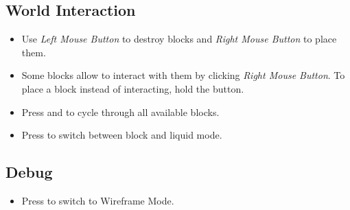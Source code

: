\documentclass{article}
\begin{document}
    \subsection{World Interaction}\label{subsec:world-interaction}
    \begin{itemize}
        \item Use \textit{Left Mouse Button} to destroy blocks and \textit{Right Mouse Button} to place them.
        \item Some blocks allow to interact with them by clicking \textit{Right Mouse Button}.
        To place a block instead of interacting, hold the \keys{\ctrl} button.
        \item Press  and  to cycle through all available blocks.
        \item Press  to switch between block and liquid mode.
    \end{itemize}

    \subsection{Debug}\label{subsec:debug}
    \begin{itemize}
        \item Press  to switch to Wireframe Mode.
    \end{itemize}
\end{document}
